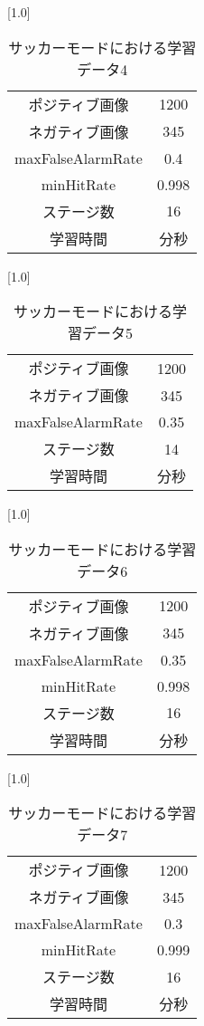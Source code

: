 \begin{table}[h]
  \centering
  \scalebox{1.0}[1.0]{
   \begin{tabular}{cc}	\hline
    ポジティブ画像 & 1200  \\    
    ネガティブ画像 & 345  \\
    maxFalseAlarmRate & 0.4 \\
    minHitRate & 0.998 \\
    ステージ数 & 16  \\ 
    学習時間 & 分秒  \\ \hline
   \end{tabular}
  } 
  \caption{サッカーモードにおける学習データ4}
  \label{soccerstudy}
\end{table}


\begin{table}[h]
  \centering
  \scalebox{1.0}[1.0]{
   \begin{tabular}{cc}	\hline
    ポジティブ画像 & 1200  \\    
    ネガティブ画像 & 345  \\
    maxFalseAlarmRate & 0.35 \\
    ステージ数 & 14  \\ 
    学習時間 & 分秒  \\ \hline
   \end{tabular}
  } 
  \caption{サッカーモードにおける学習データ5}
  \label{soccerstudy}
\end{table}


\begin{table}[h]
  \centering
  \scalebox{1.0}[1.0]{
   \begin{tabular}{cc}	\hline
    ポジティブ画像 & 1200  \\    
    ネガティブ画像 & 345  \\
    maxFalseAlarmRate & 0.35 \\
    minHitRate & 0.998 \\
    ステージ数 & 16  \\ 
    学習時間 & 分秒  \\ \hline
   \end{tabular}
  } 
  \caption{サッカーモードにおける学習データ6}
  \label{soccerstudy}
\end{table}

\begin{table}[h]
  \centering
  \scalebox{1.0}[1.0]{
   \begin{tabular}{cc}	\hline
    ポジティブ画像 & 1200  \\    
    ネガティブ画像 & 345  \\
    maxFalseAlarmRate & 0.3 \\
    minHitRate & 0.999 \\
    ステージ数 & 16  \\ 
    学習時間 & 分秒  \\ \hline
   \end{tabular}
  } 
  \caption{サッカーモードにおける学習データ7}
  \label{soccerstudy}
\end{table}
